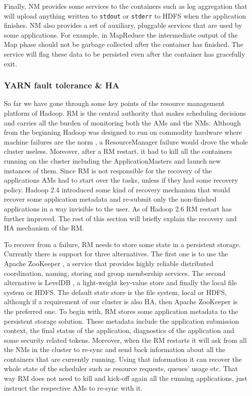 Finally, NM provides some services to the containers such as log
aggregation that will upload anything written to \texttt{stdout} or \texttt{stderr} to
HDFS when the application finishes. NM also provides a set of
auxiliary, pluggable services that are used by some applications. For
example, in MapReduce the intermediate output of the Map phase should
not be garbage collected after the container has finished. The
service will flag these data to be persisted even after the container
has gracefully exit.

\subsubsection{YARN fault tolerance \& HA}
\label{sssec:yarn_ha}
So far we have gone through some key points of the resource management
platform of Hadoop. RM is the central authority that makes scheduling
decisions and carries all the burden of monitoring both the AMs and
the NMs. Although from the beginning Hadoop was designed to run on
commodity hardware where machine failures are the norm
\cite{doi:10.2200/S00516ED2V01Y201306CAC024, Dean:2013:TS:2408776.2408794}, a
ResourceManager failure would drove the whole cluster
useless. Moreover, after a RM restart, it had to kill all the
containers running on the cluster including the ApplicationMasters and
launch new instances of them. Since RM is not responsible for the
recovery of the applications AMs had to start over the tasks, unless if
they had some recovery policy. Hadoop 2.4 introduced some kind of recovery mechanism that would
recover some application metadata and re-submit only the non-finished
applications in a way invisible to the user. As of Hadoop 2.6 RM
restart has further improved. The rest of this section will briefly
explain the recovery and HA mechanism of the RM.

To recover from a failure, RM needs to
store some state in a persistent storage. Currently there is support
for three alternatives. The first one is to use the Apache ZooKeeper
\cite{Hunt:2010:ZWC:1855840.1855851}, a service that provides highly reliable
distributed coordination, naming, storing and group membership
services. The second alternative is LevelDB \cite{google_leveldb},
a light-weight key-value store and finally the local file system or
HDFS. The default state store is the file system, local or HDFS, although
if a requirement of our cluster is also HA, then Apache ZooKeeper is
the preferred one. To begin with, RM stores some application metadata to
the persistent storage solution. These metadata include the
application submission context, the final status of the application,
diagnostics of the application and some security related
tokens. Moreover, when the RM restarts it will ask from all the NMs in
the cluster to re-sync and send back information about all the
containers that are currently running. Using that information it can
recover the whole state of the scheduler such as resource requests,
queues' usage etc. That way RM does not need to kill and kick-off again all
the running applications, just instruct the respective AMs to re-sync
with it.

